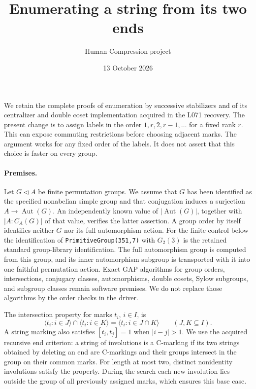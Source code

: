 \documentclass[11pt,a4paper]{article}
\title{Enumerating a string from its two ends}
\author{Human Compression project}
\date{13 October 2026}
\newcommand{\gen}[1]{\langle#1\rangle}
\begin{document}
\maketitle

We retain the complete proofs of enumeration by successive stabilizers
and of its centralizer and double coset implementation acquired in the
L071 recovery. The present change is to assign labels in the order
$1,r,2,r-1,\ldots$ for a fixed rank $r$. This can expose commuting
restrictions before choosing adjacent marks. The argument works for any
fixed order of the labels. It does not assert that this choice is faster
on every group.

\paragraph{Premises.}
Let $G\lhd A$ be finite permutation groups. We assume that $G$ has been
identified as the specified nonabelian simple group and that conjugation
induces a surjection $A\longrightarrow\operatorname{Aut}(G)$. An
independently known value of $|\operatorname{Aut}(G)|$, together with
$|A:C_A(G)|$ of that value, verifies the latter assertion. A group order
by itself identifies neither $G$ nor its full automorphism action.
For the finite control below the identification of
\texttt{PrimitiveGroup(351,7)} with $G_2(3)$ is the retained standard
group-library identification. The full automorphism group is computed
from this group, and its inner automorphism subgroup is transported with
it into one faithful permutation action. Exact GAP algorithms for group
orders, intersections, conjugacy classes, automorphisms, double cosets,
Sylow subgroups, and subgroup classes remain software premises. We do
not replace those algorithms by the order checks in the driver.

The intersection property for marks $t_i$, $i\in I$, is
\[
 \gen{t_i:i\in J}\cap\gen{t_i:i\in K}
       =\gen{t_i:i\in J\cap K}\qquad(J,K\subseteq I).
\]
A string marking also satisfies $[t_i,t_j]=1$ when $|i-j|>1$.
We use the acquired recursive end criterion: a string of involutions
is a C-marking if its two strings obtained by deleting an end are
C-markings and their groups intersect in the group on their common
marks. For length at most two, distinct nonidentity involutions satisfy
the property. During the search each new involution lies outside the
group of all previously assigned marks, which ensures this base case.
\end{document}
